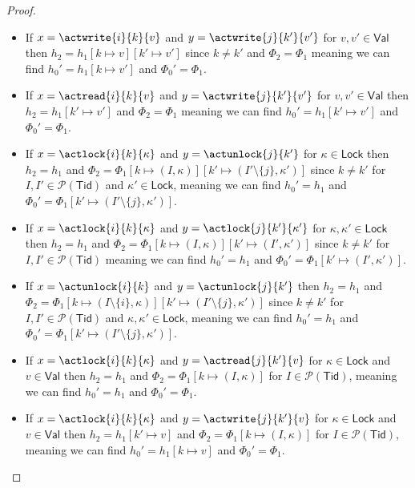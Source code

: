 \begin{proof}
\begin{itemize}
	\item If $x = \actwrite{i}{k}{v}$ and $y = \actwrite{j}{k'}{v'}$ for $v, v' \in \mathsf{Val}$ then $h_2 = h_1[k \mapsto v][k' \mapsto v']$ since $k \neq k'$ and $\Phi_2 = \Phi_1$ meaning we can find $h_0' = h_1[k \mapsto v']$ and $\Phi_0' = \Phi_1$.
	
	\item If $x = \actread{i}{k}{v}$ and $y = \actwrite{j}{k'}{v'}$ for $v, v' \in \mathsf{Val}$ then $h_2 = h_1[k' \mapsto v']$ and $\Phi_2 = \Phi_1$ meaning we can find $h_0' = h_1[k' \mapsto v']$ and $\Phi_0' = \Phi_1$.
	
	\item If $x = \actlock{i}{k}{\kappa}$ and $y = \actunlock{j}{k'}$ for $\kappa \in \mathsf{Lock}$ then $h_2 = h_1$ and $\Phi_2 = \Phi_1[k \mapsto (I, \kappa)][k' \mapsto (I' \setminus \{j\}, \kappa')]$ since $k \neq k'$ for $I, I' \in \mathcal{P}(\mathsf{Tid})$ and $\kappa' \in \mathsf{Lock}$, meaning we can find $h_0' = h_1$ and $\Phi_0' = \Phi_1[k' \mapsto (I' \setminus \{j\}, \kappa')]$.
	
	\item If $x = \actlock{i}{k}{\kappa}$ and $y = \actlock{j}{k'}{\kappa'}$ for $\kappa, \kappa' \in \mathsf{Lock}$ then $h_2 = h_1$ and $\Phi_2 = \Phi_1[k \mapsto (I, \kappa)][k' \mapsto (I', \kappa')]$ since $k \neq k'$ for $I, I' \in \mathcal{P}(\mathsf{Tid})$ meaning we can find $h_0' = h_1$ and $\Phi_0' = \Phi_1[k' \mapsto (I', \kappa')]$.
	
	\item If $x = \actunlock{i}{k}$ and $y = \actunlock{j}{k'}$ then $h_2 = h_1$ and $\Phi_2 = \Phi_1[k \mapsto (I \setminus \{i\}, \kappa)][k' \mapsto (I' \setminus \{j\}, \kappa')]$ since $k \neq k'$ for $I, I' \in \mathcal{P}(\mathsf{Tid})$ and $\kappa, \kappa' \in \mathsf{Lock}$, meaning we can find $h_0' = h_1$ and $\Phi_0' = \Phi_1[k' \mapsto (I' \setminus \{j\}, \kappa')]$.
	
	\item If $x = \actlock{i}{k}{\kappa}$ and $y = \actread{j}{k'}{v}$ for $\kappa \in \mathsf{Lock}$ and $v \in \mathsf{Val}$ then $h_2 = h_1$ and $\Phi_2 = \Phi_1[k \mapsto (I, \kappa)]$ for $I \in \mathcal{P}(\mathsf{Tid})$, meaning we can find $h_0' = h_1$ and $\Phi_0' = \Phi_1$.
	
	\item If $x = \actlock{i}{k}{\kappa}$ and $y = \actwrite{j}{k'}{v}$ for $\kappa \in \mathsf{Lock}$ and $v \in \mathsf{Val}$ then $h_2 = h_1[k' \mapsto v]$ and $\Phi_2 = \Phi_1[k \mapsto (I, \kappa)]$ for $I \in \mathcal{P}(\mathsf{Tid})$, meaning we can find $h_0' = h_1[k \mapsto v]$ and $\Phi_0' = \Phi_1$.
	

\end{itemize}
\end{proof}
